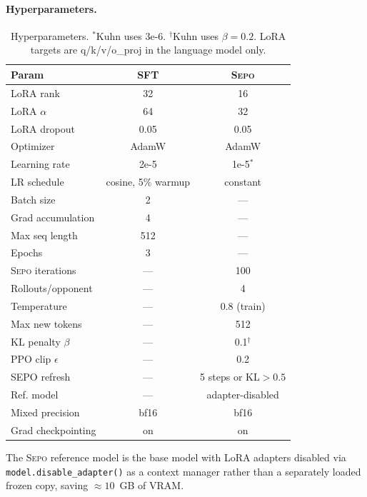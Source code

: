 \documentclass[letterpaper]{article} %
\newcommand{\sepo}{\textsc{Sepo}}
\begin{document}
\paragraph{Hyperparameters.}
\begin{table}[!t]
\centering
\footnotesize
\setlength{\tabcolsep}{3pt}
\renewcommand{\arraystretch}{0.85}
\begin{tabular}{@{}lcc@{}}
\toprule
\textbf{Param} & \textbf{SFT} & \textbf{\sepo{}} \\
\midrule
LoRA rank             & 32   & 16 \\
LoRA $\alpha$         & 64   & 32 \\
LoRA dropout          & 0.05 & 0.05 \\
Optimizer             & AdamW & AdamW \\
Learning rate         & 2e-5 & 1e-5$^*$ \\
LR schedule           & cosine, 5\% warmup & constant \\
Batch size            & 2 & --- \\
Grad accumulation     & 4 & --- \\
Max seq length        & 512 & --- \\
Epochs                & 3 & --- \\
\sepo{} iterations    & --- & 100 \\
Rollouts/opponent     & --- & 4 \\
Temperature           & --- & 0.8 (train) \\
Max new tokens        & --- & 512 \\
KL penalty $\beta$    & --- & 0.1$^\dagger$ \\
PPO clip $\epsilon$   & --- & 0.2 \\
SEPO refresh          & --- & 5 steps or KL$>0.5$ \\
Ref. model            & --- & adapter-disabled \\
Mixed precision       & bf16 & bf16 \\
Grad checkpointing    & on & on \\
\bottomrule
\end{tabular}
\caption{Hyperparameters. $^*$Kuhn uses 3e-6. $^\dagger$Kuhn uses $\beta=0.2$. LoRA targets are q/k/v/o\_proj in the language model only.}
\label{tab:hyperparams}
\end{table}
The \sepo{} reference model is the base model with LoRA adapters disabled via \texttt{model.disable\_adapter()} as a context manager rather than a separately loaded frozen copy, saving $\approx 10$~GB of VRAM.
\end{document}

